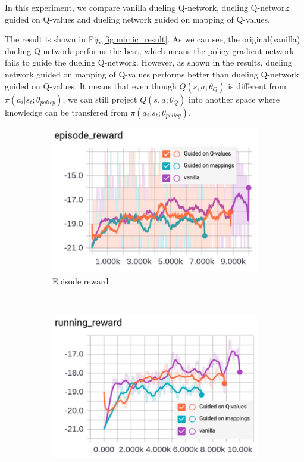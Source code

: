 In this experiment, we compare vanilla dueling Q-network, dueling Q-network guided on Q-values and dueling network guided on mapping of Q-values.

The result is shown in Fig.\ref{fig:mimic_result}. As we can see, the original(vanilla) dueling Q-network performs the best, which means the policy gradient network fails to guide the dueling Q-network.
%
However, as shown in the results, dueling network guided on mapping of Q-values performs better than dueling Q-network guided on Q-values. It means that even though $Q(s,a;\theta_{Q})$ is different from $\pi(a_i|s_t;\theta_{policy})$, we can still project $Q(s,a;\theta_{Q})$ into another space where knowledge can be transfered from $\pi(a_i|s_t;\theta_{policy})$.


\begin{figure}[h!]
	\centering
	\begin{subfigure}[t]{0.25\textwidth}
		\centering
		\includegraphics[scale=0.35,clip=true,trim = 0mm 0mm 0mm 0mm]{./fig/mimic_result_episode.png}
		\caption{Episode reward}
	\end{subfigure}%
	~ 
	\begin{subfigure}[t]{0.25\textwidth}
		\centering
		\includegraphics[scale=0.35,clip=true,trim = 0mm 0mm 0mm 0mm]{./fig/mimic_result_running.png}

\end{subfigure}
\end{figure}
